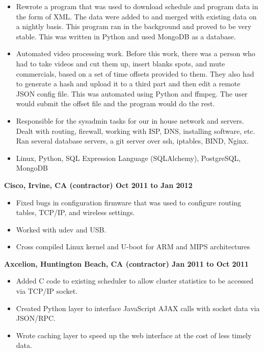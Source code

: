 \documentclass{res}
\begin{document}
\begin{resume}
\begin{itemize}
\item Rewrote a program that was used to download schedule and program
data in the form of XML.  The data were added to and merged with existing
data on a nightly basis.  This program ran in the background and proved
to be very stable.  This was written in Python and used MongoDB as
a database.

\item Automated video processing work.  Before this work, there was a
person who had to take videos and cut them up, insert blanks spots, and
mute commercials, based on a set of time offsets provided to them.  They
also had to generate a hash and upload it to a third part and then edit
a remote JSON config file.  This was automated using Python and ffmpeg.
The user would submit the offset file and the program would do the rest.

\item Responsible for the sysadmin tasks for our in house network
and servers.  Dealt with routing, firewall, working with ISP, DNS,
installing software, etc.  Ran several database servers, a git server
over ssh, iptables, BIND, Nginx.

\item Linux, Python, SQL Expression Language (SQLAlchemy), PostgreSQL,
MongoDB
\end{itemize}

{\large \bf Cisco, Irvine, CA (contractor) \hfill Oct 2011 to Jan 2012}
\begin{itemize}
\item Fixed bugs in configuration firmware that was used to configure
 routing tables, TCP/IP, and wireless settings.
\item Worked with udev and USB.
\item Cross compiled Linux kernel and U-boot for ARM and MIPS architectures
\end{itemize}

{\large \bf Axcelion, Huntington Beach, CA (contractor) \hfill Jan 2011
to Oct 2011}

\begin{itemize}

\item Added  C code to existing scheduler to allow cluster statistics
to be accessed via TCP/IP socket.

\item Created Python layer to interface JavaScript AJAX calls with socket
data via JSON/RPC.

\item Wrote caching layer to speed up the web interface at the cost of
less timely data.


\end{itemize}
\end{resume}
\end{document}
